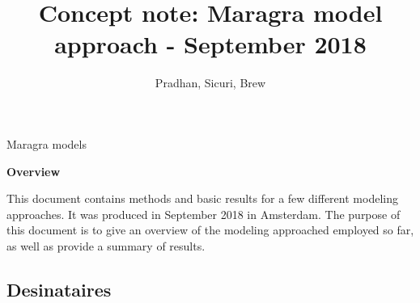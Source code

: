 \documentclass[]{article}
\title{Concept note: Maragra model approach - September 2018}
\subtitle{Pradhan, Sicuri, Brew}
\author{}
\date{}
\begin{document}
\maketitle

\begin{center}
\begin{large}

Maragra models

\end{large}
\end{center}

\vspace{5mm}

\begin{center}
\textbf{Overview}  
\end{center}

\vspace{5mm}

\begin{center}
\begin{changemargin}{3cm}{3cm} 

This document contains methods and basic results for a few different modeling approaches. It was produced in September 2018 in Amsterdam. The purpose of this document is to give an overview of the modeling approached employed so far, as well as provide a summary of results.

\end{changemargin}
\end{center}

\vspace{20mm}

\noindent{}

\vfill
\null

\subsection*{Desinataires}
\end{document}
